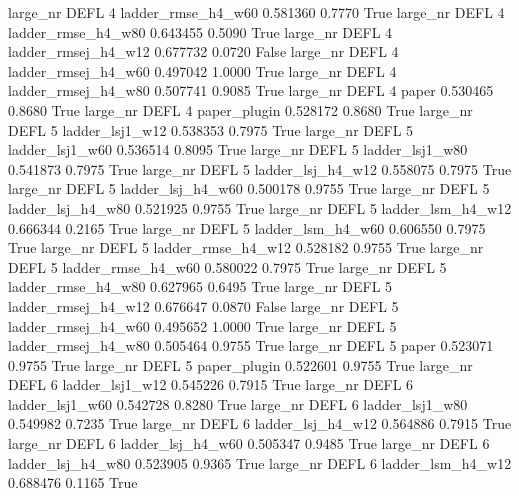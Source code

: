   large_nr     DEFL                 4  ladder_rmse_h4_w60   0.581360      0.7770    True
  large_nr     DEFL                 4  ladder_rmse_h4_w80   0.643455      0.5090    True
  large_nr     DEFL                 4 ladder_rmsej_h4_w12   0.677732      0.0720   False
  large_nr     DEFL                 4 ladder_rmsej_h4_w60   0.497042      1.0000    True
  large_nr     DEFL                 4 ladder_rmsej_h4_w80   0.507741      0.9085    True
  large_nr     DEFL                 4               paper   0.530465      0.8680    True
  large_nr     DEFL                 4        paper_plugin   0.528172      0.8680    True
  large_nr     DEFL                 5     ladder_lsj1_w12   0.538353      0.7975    True
  large_nr     DEFL                 5     ladder_lsj1_w60   0.536514      0.8095    True
  large_nr     DEFL                 5     ladder_lsj1_w80   0.541873      0.7975    True
  large_nr     DEFL                 5   ladder_lsj_h4_w12   0.558075      0.7975    True
  large_nr     DEFL                 5   ladder_lsj_h4_w60   0.500178      0.9755    True
  large_nr     DEFL                 5   ladder_lsj_h4_w80   0.521925      0.9755    True
  large_nr     DEFL                 5   ladder_lsm_h4_w12   0.666344      0.2165    True
  large_nr     DEFL                 5   ladder_lsm_h4_w60   0.606550      0.7975    True
  large_nr     DEFL                 5  ladder_rmse_h4_w12   0.528182      0.9755    True
  large_nr     DEFL                 5  ladder_rmse_h4_w60   0.580022      0.7975    True
  large_nr     DEFL                 5  ladder_rmse_h4_w80   0.627965      0.6495    True
  large_nr     DEFL                 5 ladder_rmsej_h4_w12   0.676647      0.0870   False
  large_nr     DEFL                 5 ladder_rmsej_h4_w60   0.495652      1.0000    True
  large_nr     DEFL                 5 ladder_rmsej_h4_w80   0.505464      0.9755    True
  large_nr     DEFL                 5               paper   0.523071      0.9755    True
  large_nr     DEFL                 5        paper_plugin   0.522601      0.9755    True
  large_nr     DEFL                 6     ladder_lsj1_w12   0.545226      0.7915    True
  large_nr     DEFL                 6     ladder_lsj1_w60   0.542728      0.8280    True
  large_nr     DEFL                 6     ladder_lsj1_w80   0.549982      0.7235    True
  large_nr     DEFL                 6   ladder_lsj_h4_w12   0.564886      0.7915    True
  large_nr     DEFL                 6   ladder_lsj_h4_w60   0.505347      0.9485    True
  large_nr     DEFL                 6   ladder_lsj_h4_w80   0.523905      0.9365    True
  large_nr     DEFL                 6   ladder_lsm_h4_w12   0.688476      0.1165    True
